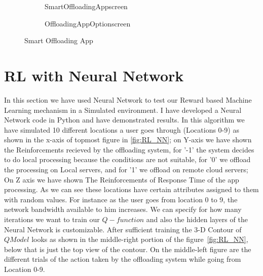 \documentclass[12pt]{report}
\begin{document}



\begin{figure}[h!]
  \centering
  \begin{subfigure}[b]{0.3\textwidth}
    \caption{SmartOffloadingAppscreen}
    \label{fig:SmartOffloadingAppscreen}
  \end{subfigure}
\quad
  \begin{subfigure}[b]{0.3\textwidth}
    \caption{OffloadingAppOptionscreen}
    \label{fig:SmartOffloadingAppOptionscreen}
  \end{subfigure}

  \caption{Smart Offloading App}\label{fig:SmartOffloadingApp}
\end{figure} 
\section{RL with Neural Network}
In this section we have used Neural Network to test our Reward based Machine Learning mechanism in a Simulated environment.
I have developed a Neural Network code in Python and have demonstrated results.
In this algorithm we have simulated 10 different locations a user goes through (Locations 0-9) as shown in the x-axis of topmost figure in \ref{fig:RL_NN}; on Y-axis we have shown the Reinforcements recieved by the offloading system, for '-1' the system decides to do local processing because the conditions are not suitable, for '0' we offload the processing on Local servers, and for '1' we offload on remote cloud servers; On Z axis we have shown The Reinforcements of Response Time of the app processing. As we can see these locations have certain attributes assigned to them with random values. For instance as the user goes from location 0 to 9, the network bandwidth available to him increases.
We can specify for how many iterations we want to train our $Q-function$ and also the hidden layers of the Neural Network is customizable. After sufficient training the 3-D Contour of $Q Model$ looks as shown in the middle-right portion of the figure~\ref{fig:RL_NN}, below that is just the top view of the contour. On the middle-left figure are the different trials of the action taken by the offloading system while going from Location 0-9.   
\end{document}
